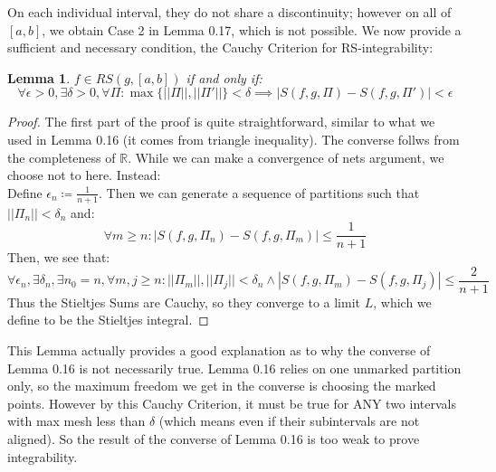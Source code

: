 \documentclass[10pt,letterpaper]{article} %
\newtheorem{lem}{Lemma}[section]
\begin{document}
On each individual interval, they do not share a discontinuity; however on all of $[a, b]$, we obtain Case 2 in Lemma 0.17, which is not possible. We now provide a sufficient and necessary condition, the Cauchy Criterion for RS-integrability:
\begin{lem}
$f \in RS(g, [a, b])$ if and only if:
\begin{equation}
\forall \epsilon > 0, \exists \delta > 0, \forall \Pi: \max\{||\Pi||, ||\Pi'||\} < \delta \implies |S(f, g, \Pi) - S(f, g, \Pi')| < \epsilon
\end{equation}
\end{lem}
\begin{proof}
The first part of the proof is quite straightforward, similar to what we used in Lemma 0.16 (it comes from triangle inequality). The converse follws from the completeness of $\mathbb{R}$. While we can make a convergence of nets argument, we choose not to here. Instead:\\

Define $\epsilon_n \coloneq \frac{1}{n+1}$. Then we can generate a sequence of partitions such that $||\Pi_n|| < \delta_n$ and:
\begin{equation*}
\forall m \geqslant n: |S(f, g, \Pi_n) - S(f, g, \Pi_m)| \leqslant \frac{1}{n+1}
\end{equation*}
Then, we see that:
\begin{equation*}
\forall \epsilon_n, \exists \delta_n, \exists n_0 = n, \forall m, j \geqslant n: ||\Pi_m||, ||\Pi_j|| < \delta_n \land |S(f, g, \Pi_m) - S(f, g, \Pi_j)| \leqslant \frac{2}{n+1} 
\end{equation*}
Thus the Stieltjes Sums are Cauchy, so they converge to a limit $L$, which we define to be the Stieltjes integral.
\end{proof}
This Lemma actually provides a good explanation as to why the converse of Lemma 0.16 is not necessarily true. Lemma 0.16 relies on one unmarked partition only, so the maximum freedom we get in the converse is choosing the marked points. However by this Cauchy Criterion, it must be true for ANY two intervals with max mesh less than $\delta$ (which means even if their subintervals are not aligned). So the result of the converse of Lemma 0.16 is too weak to prove integrability.

\pagebreak
\end{document}
